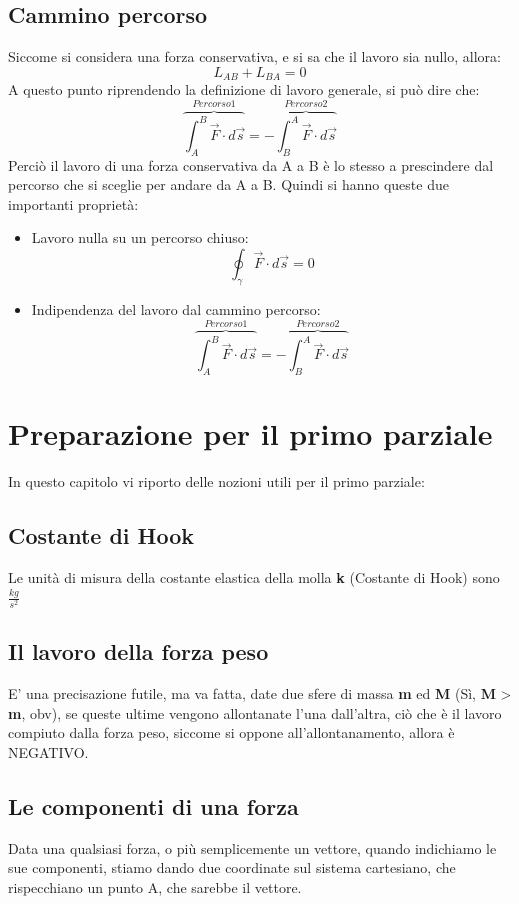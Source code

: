 \documentclass[12pt, a4paper, openany, oneside]{book}
\begin{document}
\section{Cammino percorso}
Siccome si considera una forza conservativa, e si sa che il lavoro sia nullo, 
allora: 
\[
L_{AB} + L_{BA} = 0
\]	
A questo punto riprendendo la definizione di lavoro generale, si può
dire che: 
\[
\overbrace{\int_{A}^{B} \overrightarrow{F} \cdot d \overrightarrow{s}}^{Percorso 1}
= - \overbrace{\int_{B}^{A} \overrightarrow{F} \cdot d \overrightarrow{s}}^{Percorso 2}
\]    
Perciò il lavoro di una forza conservativa da A a B è lo stesso a prescindere dal 
percorso che si sceglie per andare da A a B. Quindi si hanno queste due 
importanti proprietà: 
\begin{itemize}
	\item Lavoro nulla su un percorso chiuso: 
	\[
	\oint_{\gamma} \overrightarrow{F} \cdot d\overrightarrow{s} = 0
	\]
	\item Indipendenza del lavoro dal cammino percorso: 
	\[
	\overbrace{\int_{A}^{B} \overrightarrow{F} \cdot d \overrightarrow{s}}^{Percorso 1}
	= - \overbrace{\int_{B}^{A} \overrightarrow{F} \cdot d \overrightarrow{s}}^{Percorso 2}
	\]    
\end{itemize}
\chapter{Preparazione per il primo parziale}
In questo capitolo vi riporto delle nozioni utili per il primo parziale:
\section{Costante di Hook}
Le unità di misura della costante elastica della molla \textbf{k} (Costante di 
Hook) sono $\frac{kg}{s^{2}}$ 
\section{Il lavoro della forza peso}
E' una precisazione futile, ma va fatta, date due sfere di massa \textbf{m} ed 
\textbf{M} (Sì, \textbf{M} > \textbf{m}, obv), se queste ultime vengono allontanate
l'una dall'altra, ciò che è il lavoro compiuto dalla forza peso, siccome si 
oppone all'allontanamento, allora è NEGATIVO.
\section{Le componenti di una forza}
Data una qualsiasi forza, o più semplicemente un vettore, quando indichiamo le 
sue componenti, stiamo dando due coordinate sul sistema cartesiano, che rispecchiano
un punto A, che sarebbe il vettore. 
\end{document}
